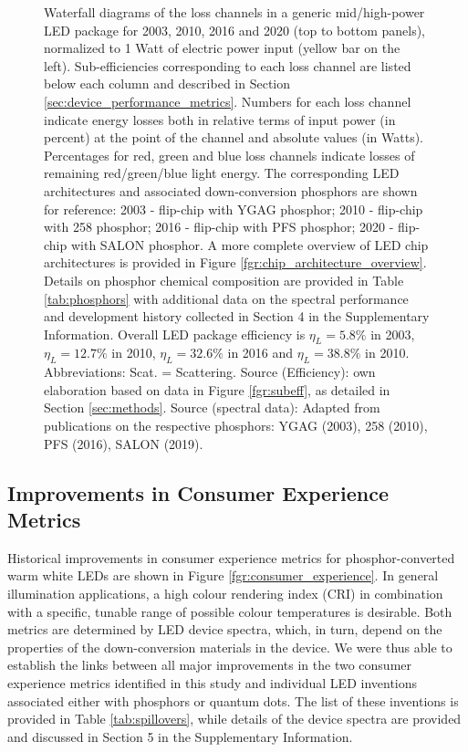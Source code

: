 \documentclass[twoside,twocolumn,9pt]{article}
\begin{document}
\begin{figure}[h!]
 \caption{Waterfall diagrams of the loss channels in a generic mid/high-power LED package for 2003, 2010, 2016 and 2020 (top to bottom panels), normalized to 1 Watt of electric power input (yellow bar on the left). Sub-efficiencies corresponding to each loss channel are listed below each column and described in Section \ref{sec:device_performance_metrics}. Numbers for each loss channel indicate energy losses both in relative terms of input power (in percent) at the point of the channel and absolute values (in Watts). Percentages for red, green and blue loss channels indicate losses of remaining red/green/blue light energy. The corresponding LED architectures and associated down-conversion phosphors are shown for reference: 2003 - flip-chip with YGAG phosphor; 2010 - flip-chip with 258 phosphor; 2016 - flip-chip with PFS phosphor; 2020 - flip-chip with SALON phosphor. A more complete overview of LED chip architectures is provided in Figure \ref{fgr:chip_architecture_overview}. Details on phosphor chemical composition are provided in Table \ref{tab:phosphors} with additional data on the spectral performance and development history collected in Section 4 in the Supplementary Information. Overall LED package efficiency is $\eta_L = 5.8\%$ in 2003, $\eta_L = 12.7\%$ in 2010, $\eta_L = 32.6\%$ in 2016 and $\eta_L = 38.8\%$ in 2010. Abbreviations: Scat. = Scattering. Source (Efficiency): own elaboration based on data in Figure \ref{fgr:subeff}, as detailed in Section \ref{sec:methods}. Source (spectral data): Adapted from publications on the respective phosphors: YGAG (2003)\cite{Mueller2002}, 258 (2010)\cite{MuellerMach2005}, PFS (2016)\cite{Murphy2015}, SALON (2019)\cite{Hoerder2019}.}
 \label{fgr:waterfall}
\end{figure}

\subsection{Improvements in Consumer Experience Metrics}

Historical improvements in consumer experience metrics for phosphor-converted warm white LEDs are shown in Figure \ref{fgr:consumer_experience}. In general illumination applications, a high colour rendering index (CRI) in combination with a specific, tunable range of possible colour temperatures is desirable. Both metrics are determined by LED device spectra, which, in turn, depend on the properties of the down-conversion materials in the device. We were thus able to establish the links between all major improvements in the two consumer experience metrics identified in this study and individual LED inventions associated either with phosphors or quantum dots. The list of these inventions is provided in Table \ref{tab:spillovers}, while details of the device spectra are provided and discussed in Section 5 in the Supplementary Information. 
\end{document}
